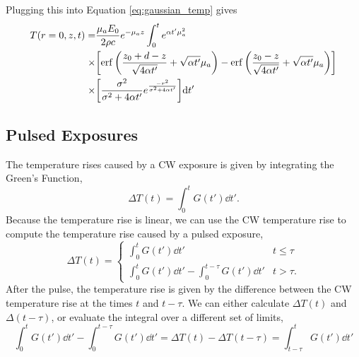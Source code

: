 \documentclass[]{article}
\begin{document}
Plugging this into Equation \ref{eq:gaussian_temp} gives
\begin{align}
  \label{eq:gaussian_off_axis_temp}
  T(r=0, z,t) =& \frac{\mu_aE_0}{2\rho c}e^{-\mu_a z} \int_0^t e^{\alpha t'\mu_a^2}  \nonumber \\
  \times & \qty[\erf\qty(\frac{z_0 + d - z}{\sqrt{4\alpha t'}} + \sqrt{\alpha t'}\mu_a ) - \erf\qty(\frac{z_0 - z}{\sqrt{4\alpha t'}} + \sqrt{\alpha t'}\mu_a ) ] \nonumber \\
  \times & \qty[
  \frac{\sigma^2}{\sigma^2 + 4\alpha t'}
  e^{\frac{-r^2}{\sigma^2 + 4\alpha t'}  }
  ]
  \dd t'
\end{align}



\subsection{Pulsed Exposures}

The temperature rises caused by a CW exposure is given by integrating the Green's Function,
\begin{equation}
  \Delta T(t) = \int_{0}^{t} G(t') \dd t'.
\end{equation}
Because the temperature rise is linear, we can use the CW temperature rise to compute
the temperature rise caused by a pulsed exposure,
\begin{equation}
  \Delta T(t) = \begin{cases}
    \int_{0}^{t} G(t') \dd t' & t \le \tau \\
    \int_{0}^{t} G(t') \dd t' - \int_{0}^{t-\tau} G(t') \dd t' & t > \tau.
\end{cases}
\end{equation}
After the pulse, the temperature rise is given by the difference between the CW temperature rise at the times $t$ and $t-\tau$.
We can either calculate $\Delta T(t)$ and $\Delta(t-\tau)$, or evaluate the integral over a different set of limits,
\begin{equation}
    \int_{0}^{t} G(t') \dd t' - \int_{0}^{t-\tau} G(t') \dd t'  = \Delta T(t) - \Delta T(t-\tau) = \int_{t-\tau}^{t} G(t') \dd t'
\end{equation}
\end{document}
